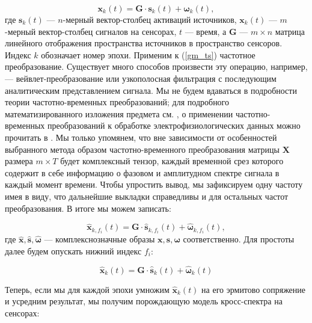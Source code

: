 \begin{equation}
    \mathbf{x}_k(t) = \mathbf{G} \cdot \mathbf{s}_k(t) + \mathbf{\omega}_k(t),
    \label{gm_ts}
\end{equation}
где $\mathbf{s}_k(t)$ --- $n$-мерный вектор-столбец активаций источников,
$\mathbf{x}_k(t)$ --- $m$-мерный вектор-столбец сигналов на сенсорах,
$t$ --- время, а $\mathbf{G}$ --- $m \times n$ матрица линейного отображения пространства источников в пространство сенсоров.
Индекс $k$ обозначает номер эпохи.
Применим к (\ref{gm_ts}) частотное преобразование. Существует много способов произвести
эту операцию, например, --- вейвлет-преобразование или узкополосная фильтрация
с последующим аналитическим представлением сигнала.
Мы не будем вдаваться в подробности теории частотно-временных преобразований;
для подробного математизированного изложения предмета см.
\cite{Oppenheim1998}, о  применении  частотно-временных преобразований к обработке
электрофизиологических данных можно прочитать в \cite{Freeman}.
Мы только упомянем, что вне зависимости от особенностей выбранного
метода образом частотно-временного преобразования матрицы $\mathbf{X}$ размера $m \times T$
будет комплексный тензор, каждый временной срез которого содержит в себе информацию
о фазовом и амплитудном спектре сигнала в каждый момент времени.
Чтобы упростить вывод, мы зафиксируем одну частоту имея в виду,
что дальнейшие выкладки справедливы и для остальных частот преобразования. В итоге мы можем записать:

\begin{equation}
    \hat{\mathbf{x}}_{k,f_i}(t) = \mathbf{G} \cdot \hat{\mathbf{s}}_{k,f_i}(t) + \hat{\mathbf{\omega}}_{k,f_i}(t),
    \label{gm_timefreq}
\end{equation}
где $\hat{\mathbf{x}}, \hat{\mathbf{s}}, \hat{\mathbf{\omega}}$ --- комплекснозначные образы $\mathbf{x}, \mathbf{s}, \mathbf{\omega}$ соответственно.
Для простоты далее будем опускать нижний индекс $f_i$:

\begin{equation}
    \hat{\mathbf{x}}_k(t) = \mathbf{G} \cdot \hat{\mathbf{s}}_k(t) + \hat{\mathbf{\omega}}_k(t)
    \label{gm_timefreq_no_fi}
\end{equation}

Теперь, если мы для каждой эпохи умножим $\hat{\mathbf{x}}_k(t)$ на его эрмитово сопряжение и усредним результат,
мы получим порождающую модель кросс-спектра на сенсорах:

